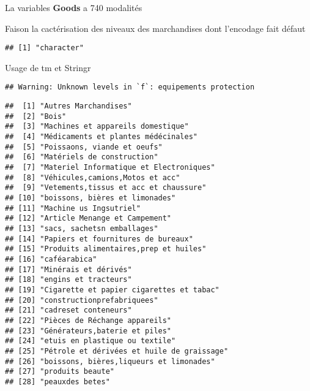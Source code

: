 \documentclass[
]{book}
\newenvironment{Shaded}{\begin{snugshade}}{\end{snugshade}}
\newcommand{\FunctionTok}[1]{\textcolor[rgb]{0.00,0.00,0.00}{#1}}
\newcommand{\NormalTok}[1]{#1}
\newcommand{\SpecialCharTok}[1]{\textcolor[rgb]{0.00,0.00,0.00}{#1}}
\begin{document}
La variables \textbf{Goods } a 740 modalités

Faison la cactérisation des niveaux des marchandises dont l'encodage fait défaut

\begin{Shaded}
\end{Shaded}

\begin{verbatim}
## [1] "character"
\end{verbatim}

Usage de tm et Stringr

\begin{verbatim}
## Warning: Unknown levels in `f`: equipements protection
\end{verbatim}

\begin{verbatim}
##  [1] "Autres Marchandises"                      
##  [2] "Bois"                                     
##  [3] "Machines et appareils domestique"         
##  [4] "Médicaments et plantes médécinales"       
##  [5] "Poissaons, viande et oeufs"               
##  [6] "Matériels de construction"                
##  [7] "Materiel Informatique et Electroniques"   
##  [8] "Véhicules,camions,Motos et acc"           
##  [9] "Vetements,tissus et acc et chaussure"     
## [10] "boissons, bières et limonades"            
## [11] "Machine us Ingsutriel"                    
## [12] "Article Menange et Campement"             
## [13] "sacs, sachetsn emballages"                
## [14] "Papiers et fournitures de bureaux"        
## [15] "Produits alimentaires,prep et huiles"     
## [16] "caféarabica"                              
## [17] "Minérais et dérivés"                      
## [18] "engins et tracteurs"                      
## [19] "Cigarette et papier cigarettes et tabac"  
## [20] "constructionprefabriquees"                
## [21] "cadreset conteneurs"                      
## [22] "Pièces de Réchange appareils"             
## [23] "Générateurs,baterie et piles"             
## [24] "etuis en plastique ou textile"            
## [25] "Pétrole et dérivées et huile de graissage"
## [26] "boissons, bières,liqueurs et limonades"   
## [27] "produits beaute"                          
## [28] "peauxdes betes"
\end{verbatim}
\end{document}
